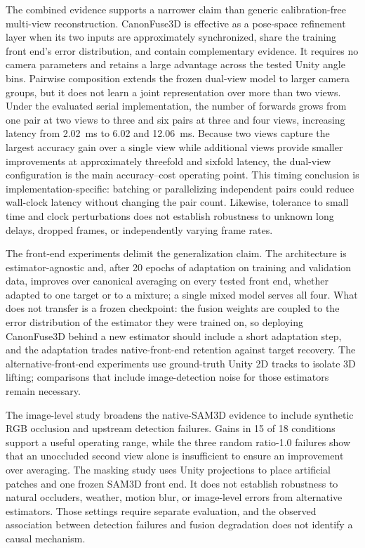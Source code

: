 \documentclass[preprint,12pt]{elsarticle}
\providecommand{\DIFaddbegin}{} %
\providecommand{\DIFaddend}{} %
\providecommand{\DIFadd}[1]{{\protect\color{blue}#1}} %
\begin{document}
The combined evidence supports a narrower claim than generic calibration-free multi-view reconstruction. CanonFuse3D is effective as a pose-space refinement layer when its two inputs are approximately synchronized, share the training front end's error distribution, and contain complementary evidence. It requires no camera parameters and retains a large advantage across the tested Unity angle bins. Pairwise composition extends the frozen dual-view model to larger camera groups, but it does not learn a joint representation over more than two views. Under the evaluated serial implementation, the number of forwards grows from one pair at two views to three and six pairs at three and four views, increasing latency from 2.02~ms to 6.02 and 12.06~ms. Because two views capture the largest accuracy gain over a single view while additional views provide smaller improvements at approximately threefold and sixfold latency, the dual-view configuration is the main accuracy--cost operating point. This timing conclusion is implementation-specific: batching or parallelizing independent pairs could reduce wall-clock latency without changing the pair count. Likewise, tolerance to small time and clock perturbations does not establish robustness to unknown long delays, dropped frames, or independently varying frame rates.

The  front-end  \DIFaddbegin \DIFadd{experiments delimit the generalization claim. The architecture is }\DIFaddend estimator-agnostic  \DIFaddbegin \DIFadd{and, after 20 epochs of adaptation on training and validation data, improves over canonical averaging on every tested front end, whether adapted to one target or to a mixture; a single mixed model serves all four. What does not transfer is a frozen checkpoint: the fusion weights are coupled to the error distribution of the estimator they were trained on, so deploying CanonFuse3D behind a new estimator should include a short adaptation step, and the adaptation trades native-front-end retention against target recovery}\DIFaddend . The alternative-front-end  \DIFaddbegin \DIFadd{experiments }\DIFaddend use ground-truth Unity 2D tracks to isolate 3D lifting; comparisons that include image-detection noise for those estimators remain necessary.

The image-level study broadens the native-SAM3D evidence to include synthetic RGB occlusion and upstream detection failures. Gains in 15 of 18 conditions support a useful operating range, while the three random ratio-1.0 failures show that an unoccluded second view alone is insufficient to ensure an improvement over averaging. The masking study uses Unity projections to place artificial patches and one frozen SAM3D front end. It does not establish robustness to natural occluders, weather, motion blur, or image-level errors from alternative estimators. Those settings require separate evaluation, and the observed association between detection failures and fusion degradation does not identify a causal mechanism.
\end{document}

